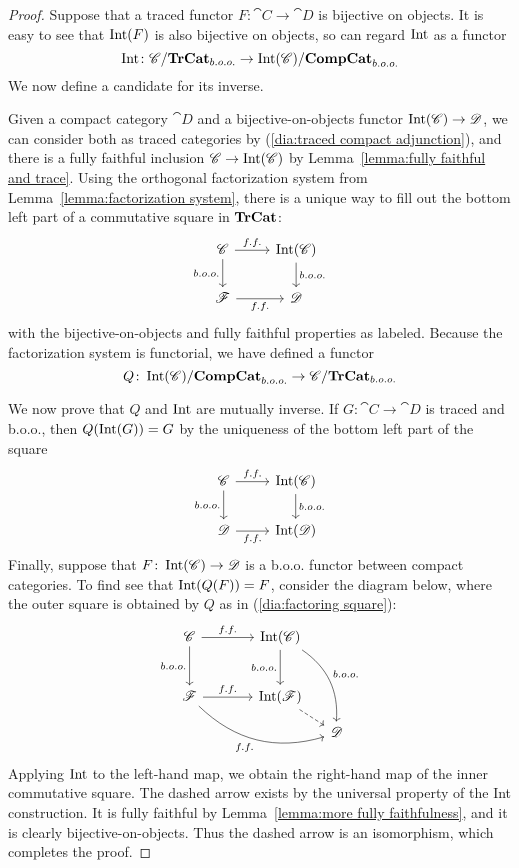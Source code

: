 \documentclass[12pt,oneside,article,draft]{memoir}
\begin{document}
\begin{proof}

Suppose that a traced functor $F\colon\cat{C}\to\cat{D}$ is bijective on objects. It is easy to see that $\operatorname{Int}(F)$ is also bijective on objects, so can regard $\operatorname{Int}$ as a functor 
$$\operatorname{Int}\colon\mathscr{C}/\mathbf{TrCat}_{b.o.o.} \to\operatorname{Int}(\mathscr{C})/\mathbf{CompCat}_{b.o.o.}$$
We now define a candidate for its inverse. 

Given a compact category $\cat{D}$ and a bijective-on-objects functor $\operatorname{Int}(\mathscr{C})\to\mathscr{D}$, we can consider both as traced categories by (\ref{dia:traced compact adjunction}), and there is a fully faithful inclusion $\mathscr{C}\to\operatorname{Int}(\mathscr{C})$ by Lemma~\ref{lemma:fully faithful and trace}. Using the orthogonal factorization system from Lemma~\ref{lemma:factorization system}, there is a unique way to fill out the bottom left part of a commutative square in $\mathbf{TrCat}$:
\begin{equation}\label{dia:factoring square}
\begin{tikzcd}
\cat{C}\arrow[r,"f.f."]\arrow[d,"b.o.o."']&\Int(\cat{C})\arrow[d,"b.o.o."]\\
\cat{F}\arrow[r,"f.f."']&\cat{D}
\end{tikzcd}
\end{equation}
with the bijective-on-objects and fully faithful properties as labeled. Because the factorization system is functorial, we have defined a functor
$$Q\colon\operatorname{Int}(\mathscr{C})/\mathbf{CompCat}_{b.o.o.}\to\mathscr{C}/\mathbf{TrCat}_{b.o.o.}$$

We now prove that $Q$ and $\operatorname{Int}$ are mutually inverse. If $G\colon\cat{C}\to\cat{D}$ is traced and b.o.o., then $Q(\operatorname{Int}(G))=G$ by the uniqueness of the bottom left part of the square
$$
\begin{tikzcd}
\cat{C}\arrow[r,"f.f."]\arrow[d,"b.o.o."']&\Int(\cat{C})\arrow[d,"b.o.o."]\\
\cat{D}\arrow[r,"f.f."']&\Int(\cat{D})
\end{tikzcd}
$$
Finally, suppose that $F\colon\operatorname{Int}(\mathscr{C})\to\mathscr{D}$ is a b.o.o. functor between compact categories. To find see that $\operatorname{Int}(Q(F))=F$, consider the diagram below, where the outer square is obtained by $Q$ as in (\ref{dia:factoring square}):
$$
\begin{tikzcd}[column sep=small, row sep=small]
\cat{C}\arrow[rr,"f.f."]\arrow[dd,"b.o.o."']&~&\Int(\cat{C})\arrow[dd,"b.o.o."']\arrow[dddr,bend left,"b.o.o."]\\~\\
\cat{F}\arrow[rr,"f.f."]\arrow[drrr,bend right, "f.f."']&&\Int(\cat{F})\arrow[dr,dashed]\\
&&&\cat{D}
\end{tikzcd}
$$
Applying $\operatorname{Int}$ to the left-hand map, we obtain the right-hand map of the inner commutative square. The dashed arrow exists by the universal property of the Int construction. It is fully faithful by Lemma~\ref{lemma:more fully faithfulness}, and it is clearly bijective-on-objects. Thus the dashed arrow is an isomorphism, which completes the proof.

\end{proof}
\end{document}
